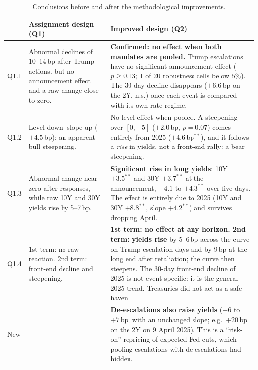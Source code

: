 \documentclass[11pt]{article}
\begin{document}
\begin{table}[H]
\centering
\footnotesize
\begin{tabular}{p{1.1cm}p{5.4cm}p{7.6cm}}
\toprule
 & Assignment design (Q1) & Improved design (Q2) \\
\midrule
Q1.1 & Abnormal declines of 10--14\,bp after Trump actions, but no
announcement effect and a raw change close to zero. &
\textbf{Confirmed: no effect when both mandates are pooled.} Trump escalations
have no significant announcement effect ($p\ge0.13$; 1 of 20 robustness
cells below 5\%). The 30-day decline disappears ($+6.6$\,bp on the 2Y, n.s.)
once each event is compared with its own rate regime. \\
\addlinespace
Q1.2 & Level down, slope up ($+4.5$\,bp): an apparent bull steepening. &
No level effect when pooled. A steepening over $[0,+5]$ ($+2.0$\,bp, $p=0.07$)
comes entirely from 2025 ($+4.6$\,bp$^{**}$), and it follows a \emph{rise} in
yields, not a front-end rally: a bear steepening. \\
\addlinespace
Q1.3 & Abnormal change near zero after responses, while raw 10Y and 30Y
yields rise by 5--7\,bp. & \textbf{Significant rise in long yields}: 10Y
$+3.5^{**}$ and 30Y $+3.7^{**}$ at the announcement, $+4.1$ to $+4.3^{**}$
over five days. The effect is entirely due to 2025 (10Y and 30Y
$+8.8^{**}$, slope $+4.2^{**}$) and survives dropping April. \\
\addlinespace
Q1.4 & 1st term: no raw reaction. 2nd term: front-end decline and
steepening. & \textbf{1st term: no effect at any horizon. 2nd term: yields
rise} by 5--6\,bp across the curve on Trump escalation days and by 9\,bp at
the long end after retaliation; the curve then steepens. The 30-day
front-end decline of 2025 is not event-specific: it is the general 2025
trend. Treasuries did not act as a safe haven. \\
\addlinespace
New & --- & \textbf{De-escalations also raise yields} ($+6$ to $+7$\,bp, with
an unchanged slope; e.g.\ $+20$\,bp on the 2Y on 9 April 2025). This is a
``risk-on'' repricing of expected Fed cuts, which pooling escalations with
de-escalations had hidden. \\
\bottomrule
\end{tabular}
\caption{Conclusions before and after the methodological improvements.}
\label{tab:before_after}
\end{table}
\end{document}
